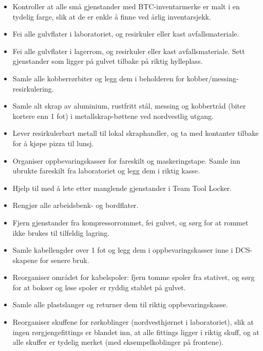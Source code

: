 \begin{itemize}
\item{} Kontroller at alle små gjenstander med BTC-inventarmerke er malt i en tydelig farge, slik at de er enkle å finne ved årlig inventarsjekk.
\item{} \underbar{\hskip 50pt} Fei alle gulvflater i laboratoriet, og resirkuler eller kast avfallsmateriale.
\item{} \underbar{\hskip 50pt} Fei alle gulvflater i lagerrom, og resirkuler eller kast avfallsmateriale. Sett gjenstander som ligger på gulvet tilbake på riktig hylleplass.
\item{} \underbar{\hskip 50pt} Samle alle kobberrørbiter og legg dem i beholderen for kobber/messing-resirkulering.
\item{} \underbar{\hskip 50pt} Samle alt skrap av aluminium, rustfritt stål, messing og kobbertråd (biter kortere enn 1 fot) i metallskrap-bøttene ved nordvestlig utgang.
\item{} \underbar{\hskip 50pt} Lever resirkulerbart metall til lokal skraphandler, og ta med kontanter tilbake for å kjøpe pizza til lunsj.
\item{} \underbar{\hskip 50pt} Organiser oppbevaringskasser for fareskilt og maskeringstape. Samle inn ubrukte fareskilt fra laboratoriet og legg dem i riktig kasse.
\item{} \underbar{\hskip 50pt} Hjelp til med å lete etter manglende gjenstander i Team Tool Locker.
\item{} \underbar{\hskip 50pt} Rengjør alle arbeidsbenk- og bordflater.
\item{} \underbar{\hskip 50pt} Fjern gjenstander fra kompressorrommet, fei gulvet, og sørg for at rommet ikke brukes til tilfeldig lagring.
\item{} \underbar{\hskip 50pt} Samle kabellengder over 1 fot og legg dem i oppbevaringskasser inne i DCS-skapene for senere bruk.
\item{} \underbar{\hskip 50pt} Reorganiser området for kabelspoler: fjern tomme spoler fra stativet, og sørg for at bokser og løse spoler er ryddig stablet på gulvet.
\item{} \underbar{\hskip 50pt} Samle alle plastslanger og returner dem til riktig oppbevaringskasse.
\item{} \underbar{\hskip 50pt} Reorganiser skuffene for rørkoblinger (nordvesthjørnet i laboratoriet), slik at ingen rørgjengefittings er blandet inn, at alle fittings ligger i riktig skuff, og at alle skuffer er tydelig merket (med eksempelkoblinger på frontene).

\end{itemize}
